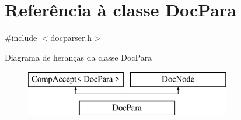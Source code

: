 \hypertarget{class_doc_para}{\section{Referência à classe Doc\-Para}
\label{class_doc_para}
}


{\ttfamily \#include $<$docparser.\-h$>$}

Diagrama de heranças da classe Doc\-Para\begin{figure}[H]
\begin{center}
\leavevmode
\includegraphics[height=2.000000cm]{class_doc_para}
\end{center}
\end{figure}
